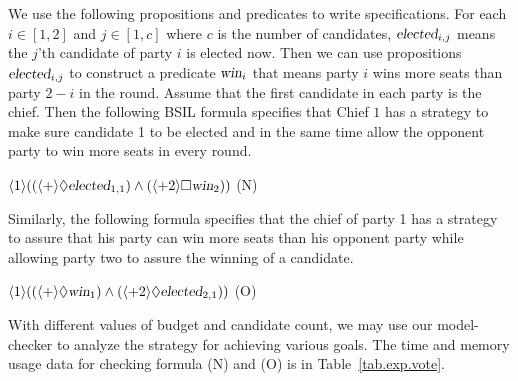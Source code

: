 We use the following propositions and predicates to write 
specifications.  
For each $i\in[1,2]$ and $j\in[1,c]$ where $c$ is the number of 
candidates, 
$\textsl{elected}_{i,j}$ means the $j$'th candidate of party $i$ is 
elected now. 
Then we can use propositions $\textsl{elected}_{i,j}$ to construct 
a predicate $\textsl{win}_i$ that means party $i$ wins more seats than party $2-i$ in the round. 
Assume that the first candidate in each party is the chief. 
Then the following BSIL formula specifies that 
Chief $1$ has a strategy to make sure candidate 1 to be elected  
and in the same time allow the opponent party to win more seats in every round.
\begin{center} 
\hfill 
$\langle 1\rangle((\langle +\rangle\Diamond \textsl{elected}_{1,1})
\wedge(\langle+2\rangle\Box \textsl{win}_2))$
\hfill (N) 
\end{center} 
Similarly, the following formula specifies that 
the chief of party 1 has a strategy to assure that his party 
can win more seats than his opponent party while allowing party two to assure 
the winning of a candidate.  
\begin{center} 
\hfill $\langle 1\rangle((\langle +\rangle \Diamond \textsl{win}_1)
\wedge(\langle +2\rangle\Diamond \textsl{elected}_{2,1}))$
\hfill (O)
\end{center} 
With different values of budget and candidate count, we may use our model-checker 
to analyze the strategy for achieving various goals.  
The time and memory usage data for checking formula (N) and (O) 
is in Table~\ref{tab.exp.vote}.
